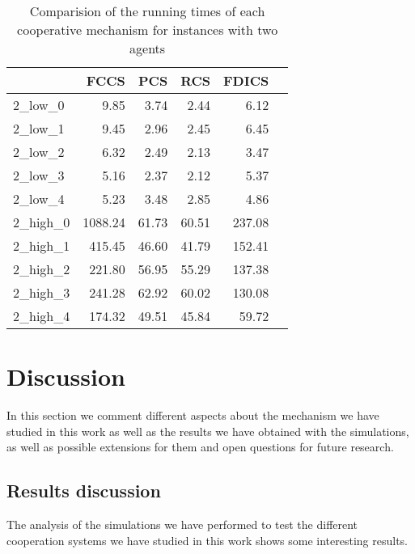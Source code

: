 \documentclass{article}
\begin{document}
\begin{table}[ht!]
\centering
\caption{Comparision of the running times of each cooperative mechanism for instances with two agents\label{tb:2_times}}
\begin{tabular}{lrrrrr}
\toprule
{} &     FCCS &  PCS &  RCS &  FDICS \\
\midrule
2\_low\_0  &               9.85 &     3.74 &      2.44 &       6.12 \\
2\_low\_1  &                 9.45 &     2.96 &      2.45 &       6.45 \\
2\_low\_2  &                6.32 &     2.49 &      2.13 &       3.47 \\
2\_low\_3  &                 5.16 &     2.37 &      2.12 &       5.37 \\
2\_low\_4  &                 5.23 &     3.48 &      2.85 &       4.86 \\
2\_high\_0 &             1088.24 &    61.73 &     60.51 &     237.08 \\
2\_high\_1 &              415.45 &    46.60 &     41.79 &     152.41 \\
2\_high\_2 &              221.80 &    56.95 &     55.29 &     137.38 \\
2\_high\_3 &              241.28 &    62.92 &     60.02 &     130.08 \\
2\_high\_4 &              174.32 &    49.51 &     45.84 &      59.72 \\
\bottomrule
\end{tabular}
\end{table}





\section{Discussion} \label{seq:discussion}

In this section we comment different aspects about the mechanism we have studied in this work as well as the results we have obtained with the simulations, as well as possible extensions for them and open questions for future research.

\subsection{Results discussion}

The analysis of the simulations we have performed to test the different cooperation systems we have studied in this work shows some interesting results.
\end{document}
